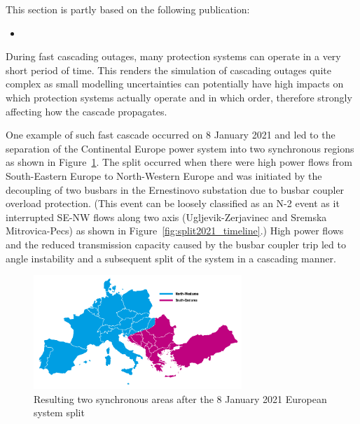 \begin{tcolorbox}[width=\linewidth, sharp corners=all,
    colback=white!80!black,
    colframe=white!80!black]
This section is partly based on the following publication:
\begin{itemize}
    \item {}
\end{itemize}
\end{tcolorbox}

During fast cascading outages, many protection systems can operate in a very short period of time. This renders the simulation of cascading outages quite complex as small modelling uncertainties can potentially have high impacts on which protection systems actually operate and in which order, therefore strongly affecting how the cascade propagates.

One example of such fast cascade occurred on 8 January 2021 and led to the separation of the Continental Europe power system into two synchronous regions as shown in Figure~\ref{fig:split2021}. The split occurred when there were high power flows from South-Eastern Europe to North-Western Europe and was initiated by the decoupling of two busbars in the Ernestinovo substation due to busbar coupler overload protection. (This event can be loosely classified as an N-2 event as it interrupted SE-NW flows along two axis (Ugljevik-Zerjavinec and Sremska Mitrovica-Pecs) as shown in Figure~\ref{fig:split2021_timeline}.) High power flows and the reduced transmission capacity caused by the busbar coupler trip led to angle instability and a subsequent split of the system in a cascading manner.

\begin{figure}
    \centering
    \includegraphics[width = 0.7\textwidth]{Figs/SystemSplit2021.pdf}
    \caption{Resulting two synchronous areas after the 8 January 2021 European system split~\cite{ENTSOESplitJan2021}}
    \label{fig:split2021}
\end{figure}

